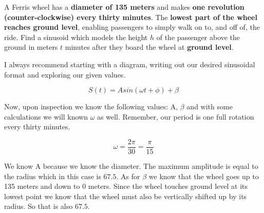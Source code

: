 \documentclass[10pt,letterpaper]{amspset}
\begin{document}
\pagebreak


\begin{problem}[3]
    A Ferris wheel has a \textbf{diameter of 135 meters} and makes \textbf{ one revolution (counter-clockwise) every thirty minutes}. The \textbf{lowest part of the wheel reaches ground level}, enabling passengers to simply walk on to, and off of, the ride. Find a sinusoid which models the height $h$ of the passenger above the ground in meters $t$ minutes after they board the wheel at \textbf{ground level}.
\end{problem}

\begin{solution}
    
    I always recommend starting with a diagram, writing out our desired sinusoidal format and exploring our given values.
    
    \[S(t) = A sin (\omega t + \phi) + \beta\]
    
    Now, upon inspection we know the following values: A, $\beta$ and with some calculations we will known $\omega$ as well. Remember, our period is one full rotation every thirty minutes.
    
    \[\omega = \frac{2\pi}{30} = \frac{\pi}{15}\]
    
    We know A because we know the diameter. The maximum amplitude is equal to the radius which in this case is $67.5$. As for $\beta$ we know that the wheel goes up to 135 meters and down to 0 meters. Since the wheel touches ground level at its lowest point we know that the wheel must also be vertically shifted up by its radius. So that is also $67.5$.
    

\end{solution}
\end{document}
